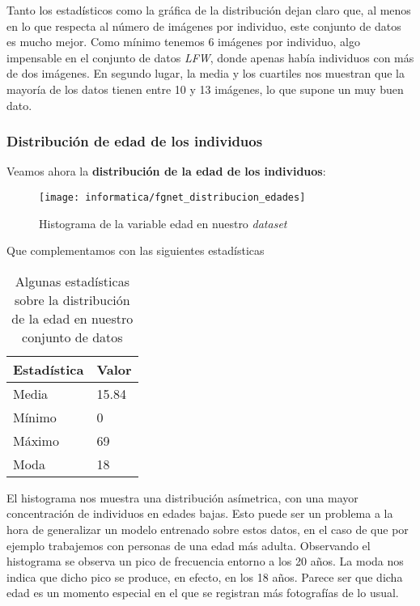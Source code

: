 Tanto los estadísticos como la gráfica de la distribución dejan claro que, al menos en lo que respecta al número de imágenes por individuo, este conjunto de datos es mucho mejor. Como mínimo tenemos 6 imágenes por individuo, algo impensable en el conjunto de datos \textit{LFW}, donde apenas había individuos con más de dos imágenes. En segundo lugar, la media y los cuartiles nos muestran que la mayoría de los datos tienen entre 10 y 13 imágenes, lo que supone un muy buen dato.

\subsubsection{Distribución de edad de los individuos} \label{isubsubs:fgnet_dist_edades}

Veamos ahora la \textbf{distribución de la edad de los individuos}:

\begin{figure}[H]
    \centering
    \texttt{[image: informatica/fgnet\_distribucion\_edades]}
    \caption{Histograma de la variable edad en nuestro \textit{dataset}}
    \label{img:fgnet_histograma_edad}
\end{figure}

Que complementamos con las siguientes estadísticas

\begin{table}[H]
\centering
\begin{tabular}{|l|l|}
    \hline
    \textbf{Estadística} & \textbf{Valor} \\
    \hline

    Media  & 15.84 \\
    Mínimo & 0 \\
    Máximo & 69 \\
    Moda   & 18 \\

    \hline

\end{tabular}

    \caption{Algunas estadísticas sobre la distribución de la edad en nuestro conjunto de datos}
    \label{table:fgnet_estadisticas_edad}
\end{table}

El histograma  nos muestra una distribución asímetrica, con una mayor concentración de individuos en edades bajas. Esto puede ser un problema a la hora de generalizar un modelo entrenado sobre estos datos, en el caso de que por ejemplo trabajemos con personas de una edad más adulta. Observando el histograma se observa un pico de frecuencia entorno a los 20 años. La moda nos indica que dicho pico se produce, en efecto, en los 18 años. Parece ser que dicha edad es un momento especial en el que se registran más fotografías de lo usual.

